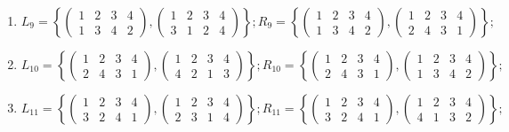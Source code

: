 \documentclass[14pt,a4paper]{scrartcl}
\begin{document}
\begin{spacing}{1}
\begin{enumerate}
		\item $L_9 = \left\{ 
		\begin{pmatrix}
		1 & 2 & 3 & 4 \\
		1 & 3 & 4 & 2
		\end{pmatrix},
		\begin{pmatrix}
		1 & 2 & 3 & 4 \\
		3 & 1 & 2 & 4
		\end{pmatrix}
		\right\};
		R_9 = \left\{ 
		\begin{pmatrix}
		1 & 2 & 3 & 4 \\
		1 & 3 & 4 & 2
		\end{pmatrix},
		\begin{pmatrix}
		1 & 2 & 3 & 4 \\
		2 & 4 & 3 & 1
		\end{pmatrix}
		\right\};$
		
		\item $L_{10} = \left\{ 
		\begin{pmatrix}
		1 & 2 & 3 & 4 \\
		2 & 4 & 3 & 1
		\end{pmatrix},
		\begin{pmatrix}
		1 & 2 & 3 & 4 \\
		4 & 2 & 1 & 3
		\end{pmatrix}
		\right\};
		R_{10} = \left\{ 
		\begin{pmatrix}
		1 & 2 & 3 & 4 \\
		2 & 4 & 3 & 1
		\end{pmatrix},
		\begin{pmatrix}
		1 & 2 & 3 & 4 \\
		1 & 3 & 4 & 2
		\end{pmatrix}
		\right\};$
		
		\item $L_{11} = \left\{ 
		\begin{pmatrix}
		1 & 2 & 3 & 4 \\
		3 & 2 & 4 & 1
		\end{pmatrix},
		\begin{pmatrix}
		1 & 2 & 3 & 4 \\
		2 & 3 & 1 & 4
		\end{pmatrix}
		\right\};
		R_{11} = \left\{ 
		\begin{pmatrix}
		1 & 2 & 3 & 4 \\
		3 & 2 & 4 & 1
		\end{pmatrix},
		\begin{pmatrix}
		1 & 2 & 3 & 4 \\
		4 & 1 & 3 & 2
		\end{pmatrix}
		\right\};$
		

\end{enumerate}
\end{spacing}
\end{document}
